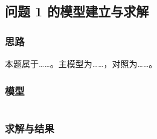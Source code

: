 \subsection{问题 1 的模型建立与求解}

\subsubsection{思路}

本题属于……。主模型为……，对照为……。

\subsubsection{模型}


\begin{equation}
  \label{eq:q1-1}
\end{equation}

\subsubsection{求解与结果}


